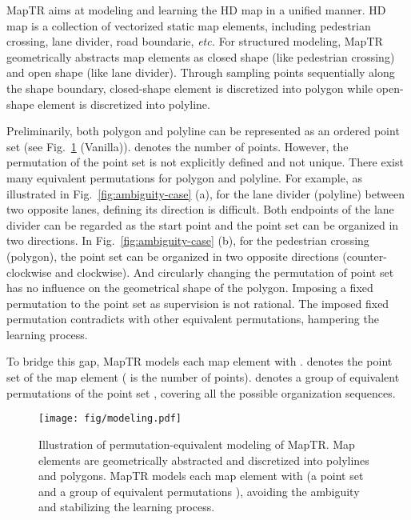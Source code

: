 \documentclass{article} \usepackage{iclr2023_conference,times}
\def\etc{\emph{etc.}}
\begin{document}
MapTR aims at modeling and learning the HD map in a unified manner.
HD map is a collection of vectorized static map elements, including pedestrian crossing, lane divider, road boundarie, \etc{}
For structured modeling,  MapTR geometrically abstracts map elements as closed shape (like pedestrian crossing) and open shape (like lane divider). 
Through sampling points sequentially along the shape boundary, closed-shape element is discretized into polygon while open-shape element is discretized into polyline. 

Preliminarily,  both polygon and polyline can be represented as an ordered point set  (see Fig.~\ref{fig:modeling} (Vanilla)).  denotes the number of points. However, the permutation of the point set is not explicitly defined and not unique. There exist many equivalent permutations for polygon and polyline.
For example, as illustrated in Fig.~\ref{fig:ambiguity-case} (a), for the lane divider (polyline) between two opposite lanes, defining its direction is difficult. Both endpoints of the lane divider can be regarded as the start point and the point set can be organized in two directions.
In Fig.~\ref{fig:ambiguity-case} (b), for the pedestrian crossing (polygon), the point set can be organized in two opposite directions (counter-clockwise and clockwise). And circularly changing the permutation of point set has no influence on the geometrical shape of the polygon.
Imposing a fixed permutation to the point set as supervision is not rational. The imposed fixed permutation contradicts with other equivalent permutations, hampering the learning process.




To bridge this gap, MapTR models each map element with . 
 denotes the point set  of the map element ( is the number of points). 
  denotes a group of equivalent permutations of the point set , covering all the possible organization sequences.


\begin{figure}[]
    \begin{center}
    \texttt{[image: fig/modeling.pdf]}
    \end{center}
    \vspace*{-0.3cm}
    \caption{Illustration of permutation-equivalent modeling of MapTR. Map elements are geometrically abstracted and discretized into polylines and polygons.
    MapTR models each map element  with  (a point set  and a group of equivalent permutations ), avoiding the  ambiguity and stabilizing the learning process.}
    \label{fig:modeling}
    \vspace*{-0.5cm}
\end{figure}
\end{document}
